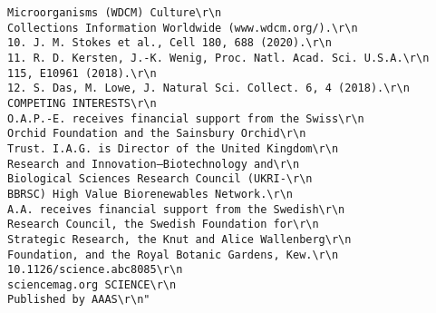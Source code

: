 \documentclass[
]{book}
\begin{document}
\begin{verbatim}
Microorganisms (WDCM) Culture\r\n                                                                      Collections Information Worldwide (www.wdcm.org/).\r\n                                                                  10. J. M. Stokes et al., Cell 180, 688 (2020).\r\n                                                                  11. R. D. Kersten, J.-K. Wenig, Proc. Natl. Acad. Sci. U.S.A.\r\n                                                                      115, E10961 (2018).\r\n                                                                  12. S. Das, M. Lowe, J. Natural Sci. Collect. 6, 4 (2018).\r\n                                                              COMPETING INTERESTS\r\n                                                              O.A.P.-E. receives financial support from the Swiss\r\n                                                              Orchid Foundation and the Sainsbury Orchid\r\n                                                              Trust. I.A.G. is Director of the United Kingdom\r\n                                                              Research and Innovation–Biotechnology and\r\n                                                              Biological Sciences Research Council (UKRI-\r\n                                                              BBRSC) High Value Biorenewables Network.\r\n                                                              A.A. receives financial support from the Swedish\r\n                                                              Research Council, the Swedish Foundation for\r\n                                                              Strategic Research, the Knut and Alice Wallenberg\r\n                                                              Foundation, and the Royal Botanic Gardens, Kew.\r\n                                                                                                10.1126/science.abc8085\r\n                                                                                              sciencemag.org SCIENCE\r\n                                          Published by AAAS\r\n"                                                                                                                                                                                                                                                                                                                                                                                                                                                                                                                                                                                                                                                                                                                                                                                                                                                                                                                                                                                                                                                                                                                                                                                                                                      
\end{verbatim}
\end{document}
